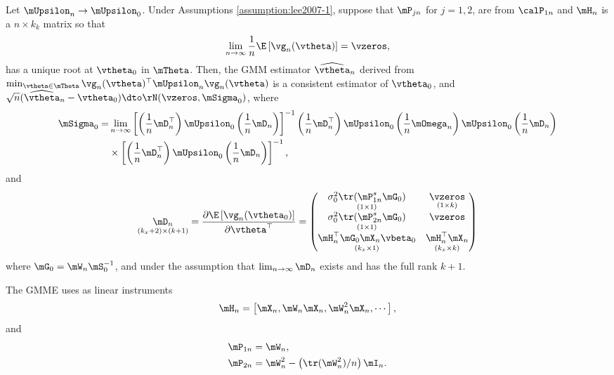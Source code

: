 \begin{theorem}\label{teo:GMME-SLM}
Let $\mUpsilon_n\to \mUpsilon_0$. Under Assumptions \ref{assumption:lee2007-1}, suppose that $\mP_{jn}$ for $j = 1, 2$, are from $\calP_{1n}$ and $\mH_n$ is a $n\times k_k$ matrix so that
\begin{equation*}
\lim_{n \to \infty}\frac{1}{n}\E\left[\vg_n(\vtheta)\right] = \vzeros, 
\end{equation*}
%
has a unique root at $\vtheta_0$ in $\mTheta$. Then, the GMM estimator $\widehat{\vtheta}_n$ derived from $\min_{\vtheta \in \mTheta}\vg_n(\vtheta)^\top\mUpsilon_n\vg_n(\vtheta)$ is a consistent estimator of $\vtheta_0$, and $\sqrt{n}(\widehat{\vtheta}_n - \vtheta_0)\dto \rN(\vzeros, \mSigma_0)$, where
\begin{equation*}
\begin{aligned}
  \mSigma_0 = &  \lim_{n\to\infty}\left[\left(\frac{1}{n}\mD_n^\top\right)\mUpsilon_0\left(\frac{1}{n}\mD_n\right)\right]^{-1}\left(\frac{1}{n}\mD_n^\top\right)\mUpsilon_0\left(\frac{1}{n}\mOmega_n\right)\mUpsilon_0\left(\frac{1}{n}\mD_n\right) \\
  & \times \left[\left(\frac{1}{n}\mD_n^\top\right)\mUpsilon_0\left(\frac{1}{n}\mD_n\right)\right]^{-1},
  \end{aligned}
\end{equation*}
%
and
\begin{equation}\label{eq:D-gmm-slm}
\underset{(k_x + 2)\times (k + 1)}{\mD_n} = \frac{\partial \E\left[\vg_n(\vtheta_0)\right]}{\partial \vtheta^\top} = \begin{pmatrix}
           \underset{(1 \times 1)}{\sigma_0^2\tr(\mP^s_{1n}\mG_0)} & \underset{(1 \times k)}{\vzeros} \\
           \underset{(1 \times 1)}{\sigma_0^2\tr(\mP^s_{2n}\mG_0)} & \vzeros \\
           \underset{(k_x \times 1)}{\mH_n^\top\mG_0\mX_n\vbeta_0} & \underset{(k_x\times k)}{\mH^\top_n\mX_n}
         \end{pmatrix}
\end{equation}
%
where $\mG_0 = \mW_n\mS_0^{-1}$, and under the assumption that $\lim_{n\to\infty}\mD_n$ exists and has the full rank $k + 1$. 
\end{theorem}

The GMME uses as linear instruments
\begin{equation*}
\mH_n = \left[\mX_n, \mW_n\mX_n, \mW_n^2\mX_n, \cdots\right],
\end{equation*}
%
and
\begin{align*}
\mP_{1n} & = \mW_n, \\
\mP_{2n} & = \mW^2_n - \left(\tr(\mW^2_n)/n\right)\mI_n.
\end{align*}


